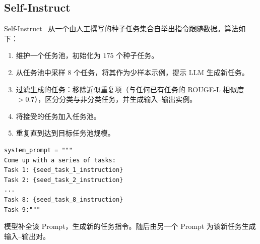\subsection{Self-Instruct}
\label{self-instruct}

Self-Instruct~\cite{wang2022selfinstruct} 从一个由人工撰写的种子任务集合自举出指令跟随数据。算法如下：

\begin{enumerate}
  \item 维护一个任务池，初始化为 $175$ 个种子任务。
  \item 从任务池中采样 $8$ 个任务，将其作为少样本示例，提示 LLM 生成新任务。
  \item 过滤生成的任务：移除近似重复项（与任何已有任务的 ROUGE-L 相似度 $> 0.7$），区分分类与非分类任务，并生成输入--输出实例。
  \item 将接受的任务加入任务池。
  \item 重复直到达到目标任务池规模。
\end{enumerate}

\begin{examplebox}
\begin{lstlisting}[style=pythonstyle]
system_prompt = """
Come up with a series of tasks:
Task 1: {seed_task_1_instruction}
Task 2: {seed_task_2_instruction}
...
Task 8: {seed_task_8_instruction}
Task 9:"""
\end{lstlisting}

模型补全该 Prompt，生成新的任务指令。随后由另一个 Prompt 为该新任务生成输入--输出对。
\end{examplebox}


